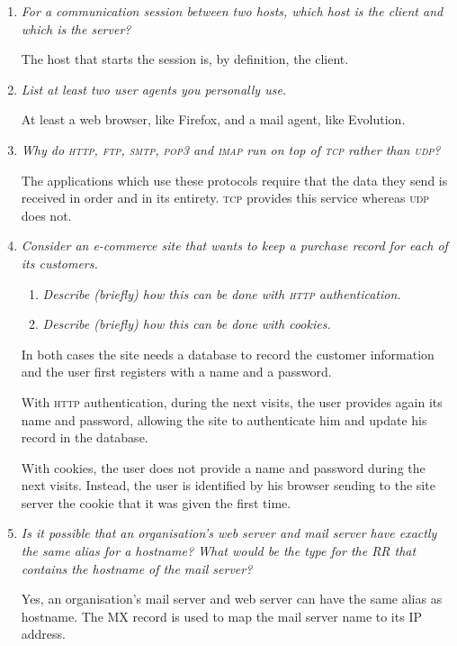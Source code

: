 \documentclass[12pt,a4paper]{article}
\begin{document}
\begin{enumerate}

  \item \emph{For a communication session between two hosts, which
    host is the client and which is the server?}

  The host that starts the session is, by definition, the client.

  \item \emph{List at least two user agents you personally use.}

  At least a web browser, like Firefox, and a mail agent, like
  Evolution.

  \item \emph{Why do \textsc{http}, \textsc{ftp}, \textsc{smtp},
    \textsc{pop3} and \textsc{imap} run on top of \textsc{tcp} rather
    than \textsc{udp}?}

  The applications which use these protocols require that the data they
  send is received in order and in its entirety. \textsc{tcp} provides
  this service whereas \textsc{udp} does not.

  \item \emph{Consider an e-commerce site that wants to keep a
    purchase record for each of its customers.}
  \begin{enumerate}

    \item \emph{Describe (briefly) how this can be done with
      \textsc{http} authentication.}

    \item \emph{Describe (briefly) how this can be done with cookies.}

  \end{enumerate}

  In both cases the site needs a database to record the customer
  information and the user first registers with a name and a password.

  With \textsc{http} authentication, during the next visits, the user
  provides again its name and password, allowing the site to
  authenticate him and update his record in the database.

  With cookies, the user does not provide a name and password during
  the next visits. Instead, the user is identified by his browser
  sending to the site server the cookie that it was given the first
  time.

  \item \emph{Is it possible that an organisation's web server and
    mail server have exactly the same alias for a hostname? What would
    be the type for the RR that contains the hostname of the mail
    server?}

  Yes, an organisation's mail server and web server can have the same
  alias as hostname. The MX record is used to map the mail server name
  to its IP address.

\end{enumerate}
\end{document}
